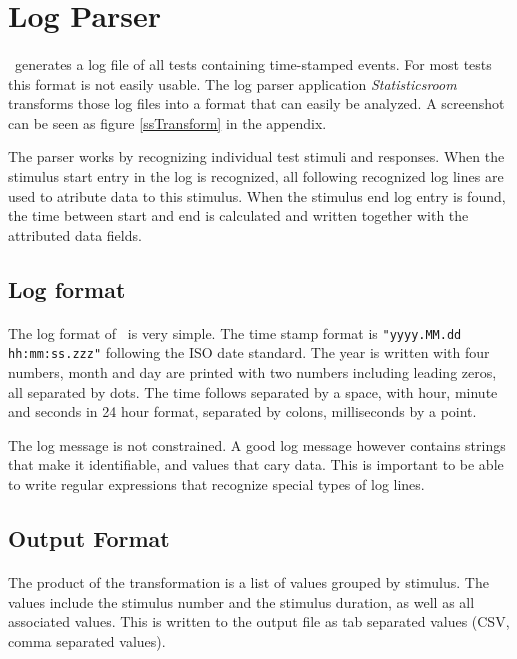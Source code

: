 \section{Log Parser}
\paragraph{}
\ER\ generates  a log file of all tests containing time-stamped events.
For most tests this format is not easily usable.
The log parser application \textit{Statisticsroom} transforms those log files into a format that can easily be analyzed.
A screenshot can be seen as figure \ref{ssTransform} in the appendix.

The parser works by recognizing individual test stimuli and responses.
When the stimulus start entry in the log is recognized, all following recognized log lines are used to atribute data to this stimulus.
When the stimulus end log entry is found, the time between start and end is calculated and written together with the attributed data fields.

\subsection{Log format}
\paragraph{}
The log format of \ER\ is very simple.
The time stamp format is \lstinline{"yyyy.MM.dd hh:mm:ss.zzz"} following the ISO date standard.
The year is written with four numbers, month and day are printed with two numbers including leading zeros, all separated by dots.
The time follows separated by a space, with hour, minute and seconds in 24 hour format, separated by colons, milliseconds by a point.

The log message is not constrained.
A good log message however contains strings that make it identifiable, and values that cary data.
This is important to be able to write regular expressions that recognize special types of log lines.


\subsection{Output Format}
\paragraph{}
The product of the transformation is a list of values grouped by stimulus.
The values include the stimulus number and the stimulus duration, as well as all associated values.
This is written to the output file as tab separated values (CSV, comma separated values).

